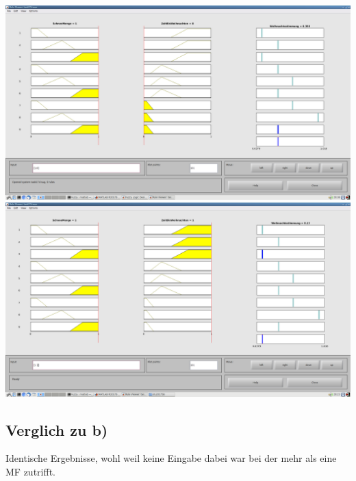 \includegraphics[width=\textwidth]{part/screenshots/fuzzy-17d-1-0}
\includegraphics[width=\textwidth]{part/screenshots/fuzzy-17d-1-1}

\subsection*{Verglich zu b)}

Identische Ergebnisse, wohl weil keine Eingabe dabei war bei der mehr als eine MF zutrifft.